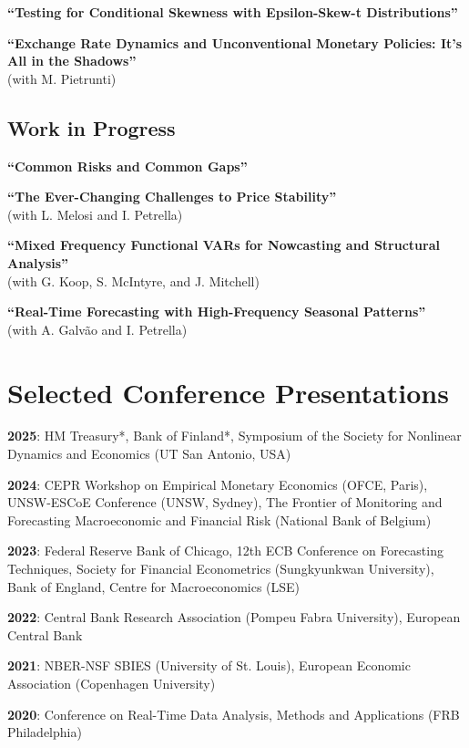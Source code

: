 \documentclass[11pt,a4paper]{article}
\begin{document}
\noindent\textbf{``Testing for Conditional Skewness with Epsilon-Skew-t Distributions''}

\noindent\textbf{``Exchange Rate Dynamics and Unconventional Monetary Policies: It's All in the Shadows''}\\ (with M. Pietrunti)

\subsection{Work in Progress}

\noindent\textbf{``Common Risks and Common Gaps''}

\noindent\textbf{``The Ever-Changing Challenges to Price Stability''}\\ (with L. Melosi and I. Petrella)

\noindent\textbf{``Mixed Frequency Functional VARs for Nowcasting and Structural Analysis''}\\ (with G. Koop, S. McIntyre, and J. Mitchell)

\noindent\textbf{``Real-Time Forecasting with High-Frequency Seasonal Patterns''} \\(with A. Galvão and I. Petrella)

\section{Selected Conference Presentations}

\noindent\textbf{2025}: HM Treasury*, Bank of Finland*, Symposium of the Society for Nonlinear Dynamics and Economics (UT San Antonio, USA)

\noindent\textbf{2024}: CEPR Workshop on Empirical Monetary Economics (OFCE, Paris), UNSW-ESCoE Conference (UNSW, Sydney), The Frontier of Monitoring and Forecasting Macroeconomic and Financial Risk (National Bank of Belgium)

\noindent\textbf{2023}: Federal Reserve Bank of Chicago, 12th ECB Conference on Forecasting Techniques, Society for Financial Econometrics (Sungkyunkwan University), Bank of England, Centre for Macroeconomics (LSE)

\noindent\textbf{2022}: Central Bank Research Association (Pompeu Fabra University), European Central Bank

\noindent\textbf{2021}: NBER-NSF SBIES (University of St. Louis), European Economic Association (Copenhagen University)

\noindent\textbf{2020}: Conference on Real-Time Data Analysis, Methods and Applications (FRB Philadelphia)
\end{document}
